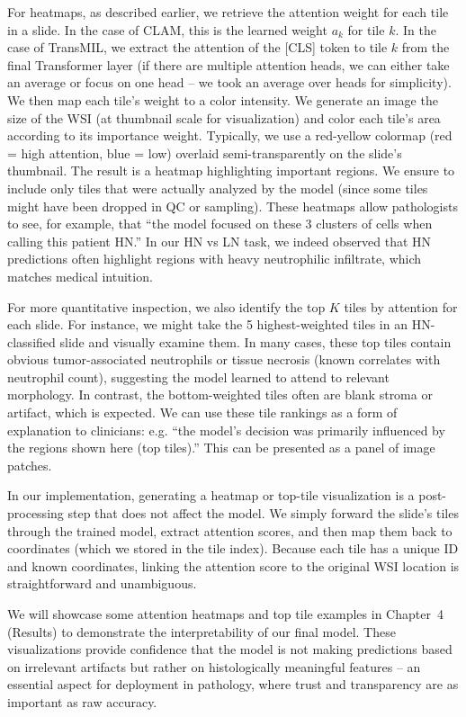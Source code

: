 For heatmaps, as described earlier, we retrieve the attention weight for each tile in a slide. In the case of CLAM, this is the learned weight $a_k$ for tile $k$. In the case of TransMIL, we extract the attention of the [CLS] token to tile $k$ from the final Transformer layer (if there are multiple attention heads, we can either take an average or focus on one head – we took an average over heads for simplicity). We then map each tile’s weight to a color intensity. We generate an image the size of the WSI (at thumbnail scale for visualization) and color each tile’s area according to its importance weight. Typically, we use a red-yellow colormap (red = high attention, blue = low) overlaid semi-transparently on the slide’s thumbnail. The result is a heatmap highlighting important regions. We ensure to include only tiles that were actually analyzed by the model (since some tiles might have been dropped in QC or sampling). These heatmaps allow pathologists to see, for example, that “the model focused on these 3 clusters of cells when calling this patient HN.” In our HN vs LN task, we indeed observed that HN predictions often highlight regions with heavy neutrophilic infiltrate, which matches medical intuition.

For more quantitative inspection, we also identify the top $K$ tiles by attention for each slide. For instance, we might take the 5 highest-weighted tiles in an HN-classified slide and visually examine them. In many cases, these top tiles contain obvious tumor-associated neutrophils or tissue necrosis (known correlates with neutrophil count), suggesting the model learned to attend to relevant morphology. In contrast, the bottom-weighted tiles often are blank stroma or artifact, which is expected. We can use these tile rankings as a form of explanation to clinicians: e.g. “the model’s decision was primarily influenced by the regions shown here (top tiles).” This can be presented as a panel of image patches.

In our implementation, generating a heatmap or top-tile visualization is a post-processing step that does not affect the model. We simply forward the slide’s tiles through the trained model, extract attention scores, and then map them back to coordinates (which we stored in the tile index). Because each tile has a unique ID and known coordinates, linking the attention score to the original WSI location is straightforward and unambiguous.

We will showcase some attention heatmaps and top tile examples in Chapter~4 (Results) to demonstrate the interpretability of our final model. These visualizations provide confidence that the model is not making predictions based on irrelevant artifacts but rather on histologically meaningful features – an essential aspect for deployment in pathology, where trust and transparency are as important as raw accuracy.

